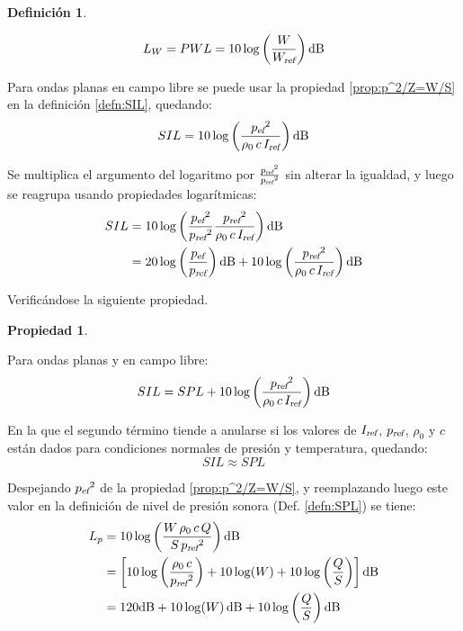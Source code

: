 \documentclass[a5paper,12pt,twoside]{book}
\newtheorem{defn}{{Definición}}[chapter]
\newtheorem{prop}{{Propiedad}}[chapter]
\begin{document}
\begin{mdframed}[style=MyFrame1]
    \begin{defn}
        \label{defn:PWL}
    \end{defn}
    \begin{equation*}
        L_W = PWL = 10 \log \left( \frac{W}{\sub{W}{ref}} \right)\si{\deci\bel}
    \end{equation*}
\end{mdframed}

Para ondas planas en campo libre se puede usar la propiedad \ref{prop:p^2/Z=W/S} en la definición \ref{defn:SIL}, quedando:
\begin{equation*}
    SIL = 10 \log \left( \frac{\rms{p}^2}{\rho_0 \, c \, \sub{I}{ref}} \right) \si{\deci\bel}
\end{equation*}

Se multiplica el argumento del logaritmo por $\tfrac{{{p}_\textsl{{ref}}}^2}{{{p}_\textsl{{ref}}}^2}$ sin alterar la igualdad, y luego se reagrupa usando propiedades logarítmicas:
\begin{align*}
    SIL &= 10 \log \left( \frac{\rms{p}^2}{\sub{p}{ref}^2} \frac{\sub{p}{ref}^2}{\rho_0 \, c \, \sub{I}{ref}} \right) \si{\deci\bel}
    \\
    &= 20 \log \left( \frac{\rms{p}}{\sub{p}{ref}} \right) \si{\deci\bel} + 10 \log \left( \frac{\sub{p}{ref}^2}{\rho_0 \, c \, \sub{I}{ref}} \right) \si{\deci\bel}
\end{align*}

Verificándose la siguiente propiedad.

\begin{mdframed}[style=MyFrame1]
    \begin{prop}
    \end{prop}
    Para ondas planas y en campo libre:
    \begin{equation*}
        SIL = SPL + 10 \log \left( \frac{\sub{p}{ref}^2}{\rho_0 \, c \, \sub{I}{ref}} \right) \si{\deci\bel}
    \end{equation*}
\end{mdframed}

En la que el segundo término tiende a anularse si los valores de ${{I}_\textsl{{ref}}}$, ${{p}_\textsl{{ref}}}$, $\rho_0$ y $c$ están dados para condiciones normales de presión y temperatura, quedando:
\begin{equation*}
    SIL \approx SPL
\end{equation*}

Despejando ${{{p}_\textsl{{ef}}}}^2$ de la propiedad \ref{prop:p^2/Z=W/S}, y reemplazando luego este valor en la definición de nivel de presión sonora (Def. \ref{defn:SPL}) se tiene:
\begin{align*}
    L_p &= 10 \log \left( \frac{W \, \rho_0 \, c \, Q}{S \, \sub{p}{ref}^2} \right) \si{\deci\bel}
    \\
    &= \left[ 10\log \left( \frac{\rho_0 \, c}{\sub{p}{ref}^2} \right) + 10\log(W) + 10\log \left( \frac{Q}{S} \right) \right] \si{\deci\bel}
    \\
    &= 120 \si{\deci\bel} + 10 \log(W)\,\si{\deci\bel} + 10 \log \left( \frac{Q}{S} \right) \si{\deci\bel}
\end{align*}
\end{document}
